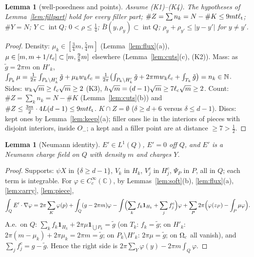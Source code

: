 \documentclass[11pt]{article}
\newtheorem{lemma}[theorem]{Lemma}
\theoremstyle{definition}
\theoremstyle{remark}
\newcommand{\C}{\mathbb C}
\newcommand{\N}{\mathbb N}
\newcommand{\dep}{\delta}
\newcommand{\lc}{\ell_{\rm c}}
\newcommand{\lt}{\ell_{\rm t}}
\begin{document}
\begin{lemma}[well-posedness and points]\label{lem:points}
Assume (K1)--(K4). The hypotheses of Lemma~\ref{lem:fillpart} hold for every filler part; $\#Z=\sum n_k=N-\#K\le9mt\lt$; $\#Y=N$; $Y\subset\operatorname{int}Q$;
$0<\rho\le\frac14$; $\bar B(y,\rho_y)\subset\operatorname{int}Q$; $\rho_y+\rho_{y'}\le|y-y'|$ for $y\ne y'$.
\end{lemma}
\begin{proof}
Density: $\mu_k\in[\frac34m,\frac54m]$ (Lemma~\ref{lem:flux}(a)), $\mu\in[m,m+1/\lc]\subset[m,\frac98m]$ elsewhere (Lemma~\ref{lem:cuts}(c), (K2)).
Mass: as $\tilde g=2\pi m$ on $H'_k$, $\int_{P_k}\mu=\frac1{2\pi}\int_{P_k\setminus H'_k}\tilde g+\mu_kw_k\lc=\frac1{2\pi}\bigl(\int_{P_k\setminus H'_k}\tilde g+2\pi mw_k\lc+\int_{T_k}\tilde g\bigr)=n_k\in\N$.
Sides: $w_k\sqrt m\ge\lc\sqrt m\ge2$ (K3), $h\sqrt m=(d-1)\sqrt m\ge7\lc\sqrt m\ge2$. Count: $\#Z=\sum_kn_k=N-\#K$ (Lemma~\ref{lem:cuts}(b)) and
$\#Z\le\frac{3m}2\cdot4L(d-1)\le9mt\lt$. $K\cap Z=\emptyset$ ($\dep\ge d+6$ versus $\dep\le d-1$). Discs: kept ones by Lemma~\ref{lem:keep}(a); filler ones lie in the
interiors of pieces with disjoint interiors, inside $O_-$; a kept and a filler point are at distance $\ge7>\frac12$.
\end{proof}

\begin{lemma}[Neumann identity]\label{lem:neumann}
$E'\in L^1(Q)$, $E'=0$ off $Q$, and $E'$ is a Neumann charge field on $Q$ with density $m$ and charges $Y$.
\end{lemma}
\begin{proof}
Supports: $\psi X$ in $\{\dep\ge d-1\}$, $V_k$ in $H_k$, $V^c_j$ in $H^c_j$, $\Psi_P$ in $P$, all in $Q$; each term is integrable. For $\varphi\in C^\infty_c(\C)$, by
Lemmas~\ref{lem:soft}(b), \ref{lem:flux}(a), \ref{lem:carry}, \ref{lem:piece},
\[
\int_QE'\cdot\nabla\varphi=2\pi\sum_K\varphi(p)+\int_Q(g-2\pi m)\varphi-\int\Bigl(\sum_kf_k\mathbf 1_{H_k}+\sum_jf^c_j\Bigr)\varphi+\sum_{P}2\pi\Bigl(\varphi(z_P)-\int_P\mu\varphi\Bigr).
\]
A.e.\ on $Q$: $\sum_kf_k\mathbf 1_{H_k}+2\pi\mu\mathbf 1_{\bigcup P_k}=\tilde g$ (on $T_k$: $f_k=\tilde g$; on $H'_k$: $2\pi(m-\mu_k)+2\pi\mu_k=2\pi m=\tilde g$; on $P_k\setminus H'_k$:
$2\pi\mu=\tilde g$; on $\Omega_{\rm c}$ all vanish), and $\sum_jf^c_j=g-\tilde g$. Hence the right side is $2\pi\sum_Y\varphi(y)-2\pi m\int_Q\varphi$.
\end{proof}
\end{document}
